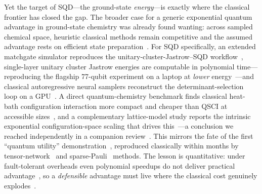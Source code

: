 Yet the target of SQD---the ground-state \emph{energy}---is exactly where the classical frontier has
closed the gap. The broader case for a generic exponential quantum advantage in ground-state
chemistry was already found wanting: across sampled chemical space, heuristic classical methods
remain competitive and the assumed advantage rests on efficient state
preparation~\cite{leechan2023}. For SQD specifically, an extended matchgate simulator reproduces the
unitary-cluster-Jastrow--SQD workflow~\cite{extraferm}, single-layer unitary cluster Jastrow
energies are computable in polynomial time---reproducing the flagship 77-qubit experiment on a
laptop at \emph{lower} energy~\cite{belagali2026}---and classical autoregressive neural samplers
reconstruct the determinant-selection loop on a GPU~\cite{hinqs2026,arnnsci2026}. A direct
quantum-chemistry benchmark finds classical heat-bath configuration interaction more compact and
cheaper than QSCI at accessible sizes~\cite{reinholdt2025}, and a complementary lattice-model study
reports the intrinsic exponential configuration-space scaling that drives this~\cite{gaberle2026}---a
conclusion we reached independently in a companion review~\cite{review}. This mirrors the fate of the first ``quantum utility''
demonstration~\cite{kim2023}, reproduced classically within months by tensor-network~\cite{tindall2024}
and sparse-Pauli~\cite{begusic2024} methods. The lesson is quantitative: under fault-tolerant
overheads even polynomial speedups do not deliver practical advantage~\cite{babbush2021}, so a
\emph{defensible} advantage must live where the classical cost genuinely
explodes~\cite{mazzola2024}.

